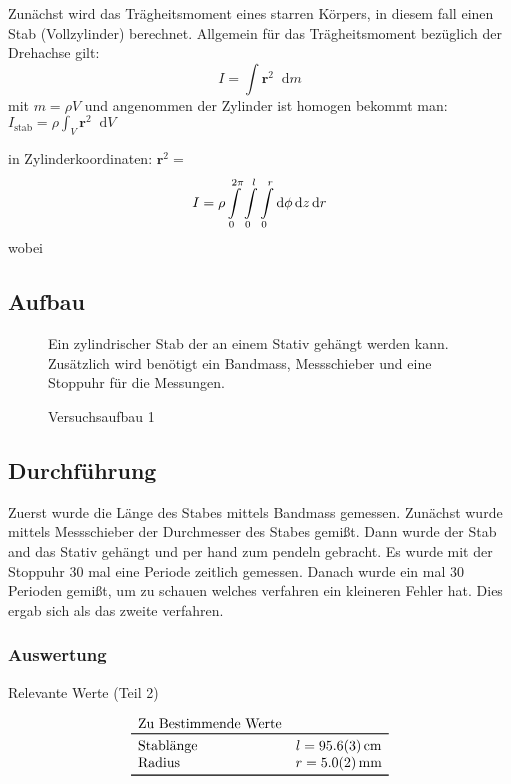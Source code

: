 \documentclass[11pt,a4paper]{article}
\newcommand\dif{\mathop{}\!\mathrm{d}}
\newcommand{\halftime}[4]{\begin{figure}[h]
\begin{minipage}{.#1\textwidth}#3\end{minipage}\begin{minipage}{.#2\textwidth}
\centering
#4\end{minipage}
\end{figure}}
\renewcommand{\vec}{\boldsymbol}
\begin{document}
Zunächst wird das Trägheitsmoment eines starren Körpers, in diesem fall einen Stab (Vollzylinder) berechnet. Allgemein für das Trägheitsmoment bezüglich der Drehachse gilt:
$$I = \int \vec{r}^2 \dif m$$
mit $m = \rho V$ und angenommen der Zylinder ist homogen bekommt man: $\displaystyle{I_{\textrm{stab}} = \rho \int_V \vec{r}^2 \dif V}$

in Zylinderkoordinaten: $\vec{r}^2 = $
$$I = \rho \int\displaylimits_{0}^{2\pi} \int\displaylimits_{0}^{l}\int\displaylimits_{0}^{r}\dif\phi \dif z \dif r$$ 
wobei 
\subsection{Aufbau}

\halftime{5}{5}{Ein zylindrischer Stab der an einem Stativ gehängt werden kann. Zusätzlich wird benötigt ein Bandmass, Messschieber und eine Stoppuhr für die Messungen. }{
\centering
\fbox{\texttt{[image: Spend]}}
   \renewcommand\thefigure{B1}
\caption{Versuchsaufbau 1}
\label{JS1}
}

\FloatBarrier
\subsection{Durchführung}

Zuerst wurde die Länge des Stabes mittels Bandmass gemessen. Zunächst wurde mittels Messschieber der Durchmesser des Stabes gemißt. Dann wurde der Stab and das Stativ gehängt und per hand zum pendeln gebracht. Es wurde mit der Stoppuhr 30 mal eine Periode zeitlich gemessen. Danach wurde ein mal 30 Perioden gemißt, um zu schauen welches verfahren ein kleineren Fehler hat. Dies ergab sich als das zweite verfahren. 

\subsubsection{Auswertung}

\begin{table}[ht]
\caption{Relevante Werte (Teil 2)}
$$
\begin{array}{lc}
	\multicolumn{1}{l}{\textrm{Zu Bestimmende Werte}} \\
	\toprule 
	\textrm{Stablänge} & l = 95.6(3)\,\textrm{cm} \\
	\textrm{Radius} & r = 5.0(2)\,\textrm{mm} \\
	\bottomrule 
\end{array}
$$
\end{table}
\end{document}

